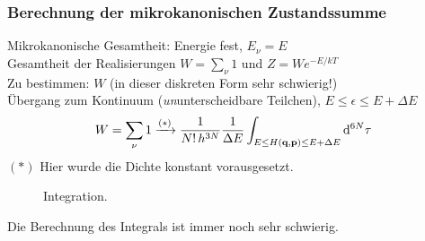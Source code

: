 \subsubsection{Berechnung der mikrokanonischen Zustandssumme}
Mikrokanonische Gesamtheit: Energie fest, $E_\nu = E$ \\
Gesamtheit der Realisierungen $W = \sum_{\nu} 1 $ und $Z = W e^{-E/kT}$ \\
Zu bestimmen: $W$ (in dieser diskreten Form sehr schwierig!) \\
Übergang zum Kontinuum (\emph{un}unterscheidbare Teilchen), $E \leq \epsilon \leq E + \Delta E$
\begin{equation}
    W = \sum_\nu 1 \xrightarrow{(*)} \frac{1}{N! \, h^{3N}} \frac{1}{\Delta E} \int_{E \leq H(\textbf{q}, \textbf{p}) \leq E + \Delta E} \mathrm{d}^{6N} \tau
\end{equation}
$(*)$ Hier wurde die Dichte konstant vorausgesetzt.
\begin{figure}[H]
        \centering
        \def\svgwidth{0.5\textwidth}
        
        \caption{Integration.}
        \label{img:phaseSpaceBall2}
\end{figure}
Die Berechnung des Integrals ist immer noch sehr schwierig.

